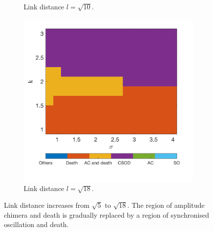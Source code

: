 \documentclass[12pt]{article}
\begin{document}
\begin{figure}[h]
\begin{subfigure}[b]{0.4\linewidth}
    \caption{Link distance $l=\sqrt{10}$.}
    \end{subfigure}
    \hfill
    \begin{subfigure}[b]{0.4\linewidth}
    \centering
    \includegraphics[width=\textwidth]{Xinzhu Section/2dlat16_sqrt(18).png}
    \caption{Link distance $l=\sqrt{18}$.}
    \end{subfigure}

    \caption{Link distance increases from $\sqrt{5}$ to $\sqrt{18}$. The region of amplitude chimera and death is gradually replaced by a region of synchronised oscillation and death.}
    \label{fig:b link distances and parameter searches}
\end{figure}
\end{document}
